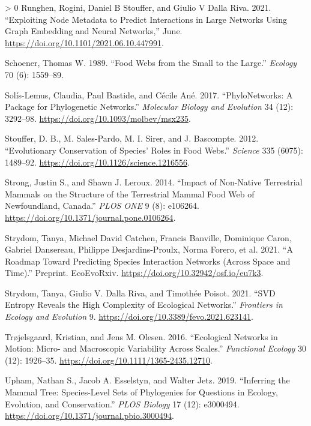 \documentclass[10pt,oneside]{article}
\newlength{\cslhangindent}
\newenvironment{CSLReferences}[3] %
 {%
  \setlength{\parindent}{0pt}
  \ifodd #1 \everypar{\setlength{\hangindent}{\cslhangindent}}\ignorespaces\fi
  \ifnum #2 > 0
  \setlength{\parskip}{#2\baselineskip}
  \fi
 }%
 {}
\begin{document}
\begin{CSLReferences}{1}{0}
\leavevmode\hypertarget{ref-Runghen2021ExpNod}{}%
Runghen, Rogini, Daniel B Stouffer, and Giulio V Dalla Riva. 2021.
{``Exploiting Node Metadata to Predict Interactions in Large Networks
Using Graph Embedding and Neural Networks,''} June.
\url{https://doi.org/10.1101/2021.06.10.447991}.

\leavevmode\hypertarget{ref-Schoener1989FooWeb}{}%
Schoener, Thomas W. 1989. {``Food Webs from the Small to the Large.''}
\emph{Ecology} 70 (6): 1559--89.

\leavevmode\hypertarget{ref-Solis-Lemus2017PhyPac}{}%
Solís-Lemus, Claudia, Paul Bastide, and Cécile Ané. 2017.
{``PhyloNetworks: A Package for Phylogenetic Networks.''}
\emph{Molecular Biology and Evolution} 34 (12): 3292--98.
\url{https://doi.org/10.1093/molbev/msx235}.

\leavevmode\hypertarget{ref-Stouffer2012EvoCona}{}%
Stouffer, D. B., M. Sales-Pardo, M. I. Sirer, and J. Bascompte. 2012.
{``Evolutionary Conservation of Species' Roles in Food Webs.''}
\emph{Science} 335 (6075): 1489--92.
\url{https://doi.org/10.1126/science.1216556}.

\leavevmode\hypertarget{ref-Strong2014ImpNona}{}%
Strong, Justin S., and Shawn J. Leroux. 2014. {``Impact of Non-Native
Terrestrial Mammals on the Structure of the Terrestrial Mammal Food Web
of Newfoundland, Canada.''} \emph{PLOS ONE} 9 (8): e106264.
\url{https://doi.org/10.1371/journal.pone.0106264}.

\leavevmode\hypertarget{ref-Strydom2021RoaPre}{}%
Strydom, Tanya, Michael David Catchen, Francis Banville, Dominique
Caron, Gabriel Dansereau, Philippe Desjardins-Proulx, Norma Forero, et
al. 2021. {``A Roadmap Toward Predicting Species Interaction Networks
(Across Space and Time).''} Preprint. EcoEvoRxiv.
\url{https://doi.org/10.32942/osf.io/eu7k3}.

\leavevmode\hypertarget{ref-Strydom2021SvdEnt}{}%
Strydom, Tanya, Giulio V. Dalla Riva, and Timothée Poisot. 2021. {``SVD
Entropy Reveals the High Complexity of Ecological Networks.''}
\emph{Frontiers in Ecology and Evolution} 9.
\url{https://doi.org/10.3389/fevo.2021.623141}.

\leavevmode\hypertarget{ref-Trojelsgaard2016EcoNet}{}%
Trøjelsgaard, Kristian, and Jens M. Olesen. 2016. {``Ecological Networks
in Motion: Micro- and Macroscopic Variability Across Scales.''}
\emph{Functional Ecology} 30 (12): 1926--35.
\url{https://doi.org/10.1111/1365-2435.12710}.

\leavevmode\hypertarget{ref-Upham2019InfMam}{}%
Upham, Nathan S., Jacob A. Esselstyn, and Walter Jetz. 2019.
{``Inferring the Mammal Tree: Species-Level Sets of Phylogenies for
Questions in Ecology, Evolution, and Conservation.''} \emph{PLOS
Biology} 17 (12): e3000494.
\url{https://doi.org/10.1371/journal.pbio.3000494}.


\end{CSLReferences}
\end{document}
